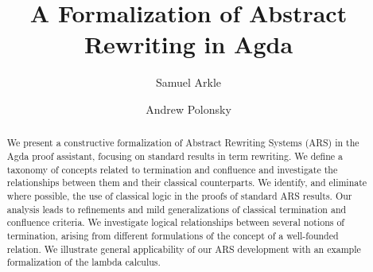 \documentclass[acmsmall,screen,review,anonymous,nonacm]{acmart}
\title{A Formalization of Abstract Rewriting in Agda}
\author{Samuel Arkle}
\affiliation{
  \institution{Appalachian State University}
  \country{USA}
}
\author{Andrew Polonsky}
\affiliation{
  \institution{Appalachian State University}
  \country{USA}
}
\theoremstyle{acmdefinition}
\begin{document}
\begin{abstract}
    We present a constructive formalization of Abstract Rewriting Systems (ARS)
    in the Agda proof assistant, focusing on standard results in term rewriting. We define a taxonomy of
concepts related to termination and confluence and investigate the
relationships between them and their classical counterparts. We identify,
and eliminate where possible, the use of classical logic in the proofs of
standard ARS results. Our analysis leads to refinements and mild
generalizations of classical termination and confluence criteria. We
investigate logical relationships between several notions of termination,
arising from different formulations of the concept of a well-founded relation. 
We illustrate general applicability of our ARS development with an example formalization of the lambda calculus. 
\end{abstract}

\maketitle 



 










    
    
\end{document}
